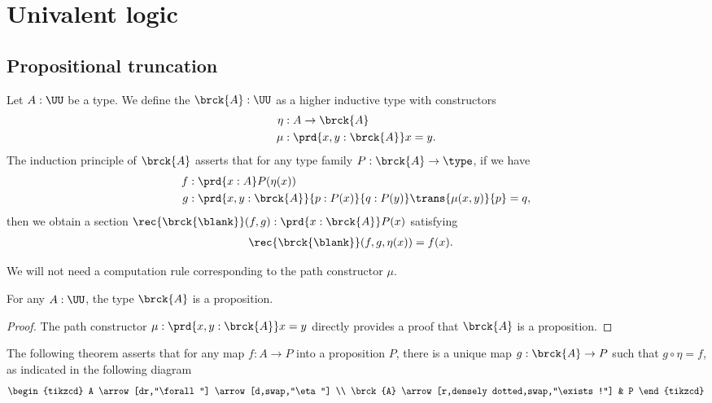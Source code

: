 \documentclass[11pt]{memoir} %
\begin{document}
\chapter{Univalent logic}


\section{Propositional truncation}

\begin{defn}
Let $A:\UU$ be a type. We define the  $\brck{A}:\UU$ as a higher inductive type with constructors
\begin{align*}
\eta & : A\to \brck{A} \\
\mu & : \prd{x,y:\brck{A}} x=y.
\end{align*}
The induction principle of $\brck{A}$ asserts that for any type family $P:\brck{A}\to\type$, if we have
\begin{align*}
f & : \prd{x:A}P(\eta(x)) \\
g & : \prd{x,y:\brck{A}}{p:P(x)}{q:P(y)} \trans{\mu(x,y)}{p}=q,
\end{align*}
then we obtain a section $\rec{\brck{\blank}}(f,g):\prd{x:\brck{A}}P(x)$ satisfying
\begin{align*}
\rec{\brck{\blank}}(f,g,\eta(x)) & = f(x).
\end{align*}
\end{defn}

\begin{rmk}
We will not need a computation rule corresponding to the path constructor $\mu$.
\end{rmk}

\begin{lem}
For any $A:\UU$, the type $\brck{A}$ is a proposition.
\end{lem}

\begin{proof}
The path constructor $\mu:\prd{x,y:\brck{A}}x=y$ directly provides a proof that $\brck{A}$ is a proposition.
\end{proof}

The following theorem asserts that for any map $f:A\to P$ into a proposition $P$, there is a unique map $g:\brck{A}\to P$ such that $g\circ\eta=f$, as indicated in the following diagram
\begin{equation*}
\begin{tikzcd}
A \arrow[dr,"\forall"] \arrow[d,swap,"\eta"] \\
\brck{A} \arrow[r,densely dotted,swap,"\exists!"] & P
\end{tikzcd}
\end{equation*}
\end{document}
